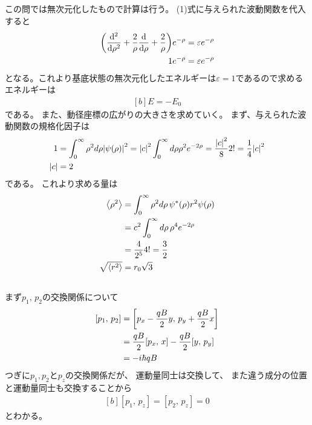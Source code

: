 \documentclass[../../master.tex]{subfiles}
\begin{document}
\subsection{}
この問では無次元化したもので計算は行う。
(1)式に与えられた波動関数を代入すると
\begin{equation}\begin{aligned}[b]
    \qty(\dv[2]{\rho}+\frac{2}{\rho}\dv{\rho}+\frac{2}{\rho})e^{-\rho} &= \varepsilon e^{-\rho}\\
    1e^{-\rho} &= \varepsilon e^{-\rho}
\end{aligned}\end{equation}
となる。これより基底状態の無次元化したエネルギーは\(\varepsilon = 1\)であるので求めるエネルギーは
\begin{equation}\begin{aligned}[b]
    E = -E_0
\end{aligned}\end{equation}
である。
また、動径座標の広がりの大きさを求めていく。
まず、与えられた波動関数の規格化因子は
\begin{equation}\begin{aligned}[b]
    1 &= \int_{0}^{\infty} \rho^2 d\rho \abs{\psi(\rho)}^2
        = \abs{c}^2\int_{0}^{\infty} d\rho \rho^2 e^{-2\rho} =\frac{\abs{c}^2}{8} 2! = \frac{1}{4}\abs{c}^2\\
    \abs{c} &= 2
\end{aligned}\end{equation}
である。
これより求める量は
\begin{equation}\begin{aligned}[b]
    \ev{\rho^2}
    &= \int_{0}^{\infty} \rho^2 d\rho\, \psi^*(\rho)r^2\psi(\rho)\\
    &= c^2 \int_{0}^{\infty} d\rho\, \rho^4 e^{-2\rho}\\
    &= \frac{4}{2^5}4! = \frac{3}{2}\\
    \sqrt{\ev{r^2}} &= r_0\sqrt{3}
\end{aligned}\end{equation}

\subsection{}
まず\(p_1,\,p_2\)の交換関係について
\begin{equation}\begin{aligned}[b]
    [p_1,\,p_2]&= \qty[p_x-\frac{qB}{2}y,\,p_y+\frac{qB}{2}x]\\
    &=\frac{qB}{2}[p_x,\,x]-\frac{qB}{2}[y,\,p_y]\\
    &= -i\hbar qB
\end{aligned}\end{equation}
つぎに\(p_1,p_2\)と\(p_z\)の交換関係だが、
運動量同士は交換して、
また違う成分の位置と運動量同士も交換することから
\begin{equation}\begin{aligned}[b]
    [p_1,\,p_z] = [p_2,\,p_z] = 0
\end{aligned}\end{equation}
とわかる。
\end{document}
